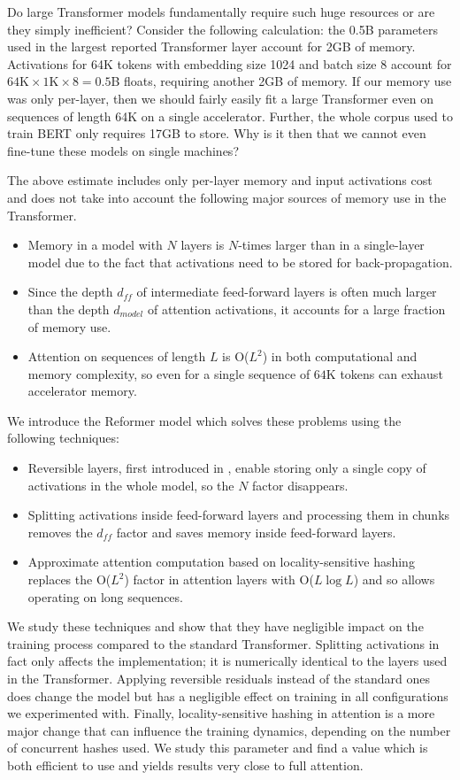 \documentclass{article} %
\begin{document}
Do large Transformer models fundamentally require such huge resources or are
they simply inefficient? Consider the following calculation: the 0.5B parameters used in the largest reported Transformer layer account for 2GB of memory. Activations for 64K tokens with embedding size 1024 and batch size 8 account for $64\text{K} \times 1\text{K} \times 8 = 0.5$B floats, requiring another 2GB of memory. If our memory use was only per-layer, then we should fairly easily fit a large Transformer even on sequences of length 64K on a single accelerator. Further, the whole corpus used to train BERT only requires 17GB to store. Why is it then that we cannot even fine-tune these models on single machines?

The above estimate includes only per-layer memory and input activations cost and does 
not take into account the following major sources of memory use in the Transformer.
\begin{itemize}
\item Memory in a model with $N$ layers is $N$-times larger than in a single-layer model due to
  the fact that activations need to be stored for back-propagation.
\item Since the depth $d_{ff}$ of intermediate feed-forward layers is often much larger than
  the depth $d_{model}$ of attention activations, it accounts for a large fraction of memory use.
\item Attention on sequences of length $L$ is O($L^2$) in both computational and memory complexity,
  so even for a single sequence of $64$K tokens can exhaust accelerator memory.
\end{itemize}

We introduce the Reformer model which solves these problems using the following techniques:
\begin{itemize}
\item Reversible layers, first introduced in \cite{gomez2017reversible}, enable storing only a single copy of activations in the whole model, so the $N$ factor disappears.
\item Splitting activations inside feed-forward layers and processing them in chunks removes the $d_{ff}$ factor and saves memory inside feed-forward layers.
\item Approximate attention computation based on locality-sensitive hashing replaces the O($L^2$) factor in attention layers with O($L\log L$) and so allows operating on long sequences.
\end{itemize}

We study these techniques and show that they have negligible impact on the training process compared to the standard Transformer. 
Splitting activations in fact only affects the implementation; it is numerically identical to the layers used in the Transformer. 
Applying reversible residuals instead of the standard ones does change the model but has a negligible effect on training in all 
configurations we experimented with.  Finally, locality-sensitive hashing in attention is a more major change that can influence
the training dynamics, depending on the number of concurrent hashes used.  We study this
parameter and find a value which is both efficient to use and yields results very close to full attention.
\end{document}
